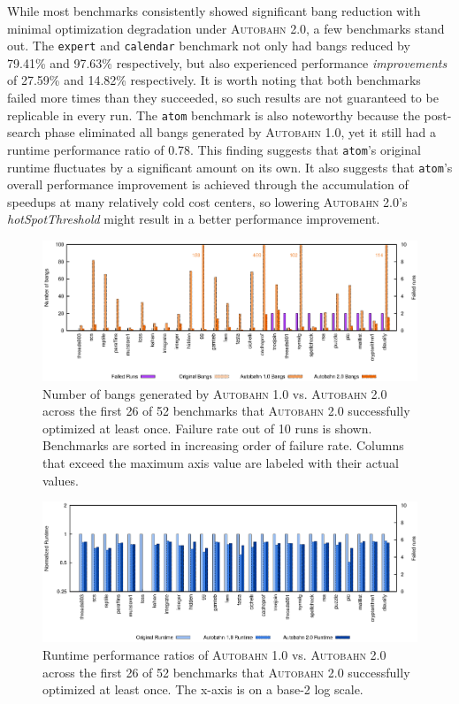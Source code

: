 \documentclass[format=sigplan, review=true, 9pt]{acmart}
\newcommand{\hotspotcost}[0]{\textit{hotSpotThreshold}}
\newcommand{\Ao}[0]{\textsc{Autobahn 1.0}}
\newcommand{\At}[0]{\textsc{Autobahn 2.0}}
\newcommand{\postopt}[0]{post-search}
\begin{document}
While most benchmarks consistently showed significant bang reduction
with minimal optimization degradation under \At{}, a few benchmarks stand
out. The \texttt{expert} and \texttt{calendar} benchmark not only had
bangs reduced by 79.41\% and 97.63\% respectively, but also
experienced performance \textit{improvements} of 27.59\% and 14.82\%
respectively. It is worth noting that both benchmarks failed
more times than they succeeded, so such results are not guaranteed to
be replicable in every run. The \texttt{atom} benchmark is also noteworthy
because the \postopt{} phase eliminated all bangs
generated by \Ao{}, yet it still had a runtime performance ratio of
0.78. This finding suggests that \texttt{atom}'s original
runtime fluctuates by a significant amount on its own. It also
suggests that \texttt{atom}'s overall performance
improvement is achieved through the accumulation of speedups at many
relatively cold cost centers, so lowering \At{}'s \hotspotcost{} 
might result in a better performance improvement.



\begin{figure}
\includegraphics[width=\textwidth]{pap0-bangs}
\caption{Number of bangs generated by \Ao{} vs. \At{} across the first
26 of 52 benchmarks that \At{} successfully optimized
at least once. Failure
rate out of 10 runs is shown. Benchmarks are sorted in increasing order of
failure rate. Columns that exceed the maximum axis value are labeled
with their actual values.}
\label{fig:2-bangs-26}
\end{figure}

\begin{figure}
\includegraphics[width=\textwidth]{pap0}
\caption{Runtime performance ratios of \Ao{} vs. \At{} across
the first 26 of 52 benchmarks that \At{} successfully optimized at least
once. The x-axis is on a base-2 log scale.} 
\label{fig:2-ratio-26}
\end{figure}
\end{document}
